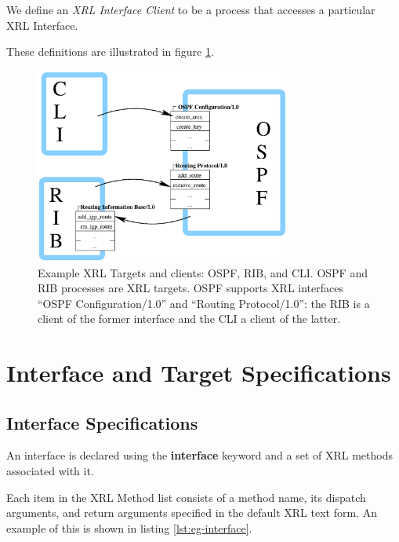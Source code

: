 \documentclass[11pt]{article}
\begin{document}
We define an \emph{XRL Interface Client} to be a process that accesses
a particular XRL Interface.

These definitions are illustrated in figure \ref{fig:eg-interfaces}.

\begin{figure}
  \begin{center}
    \includegraphics[width=0.75\textwidth]{figs/xrl_ifs}
  \end{center}
  \caption{Example XRL Targets and clients: OSPF, RIB, and CLI.
OSPF and RIB processes are XRL targets.  OSPF supports XRL interfaces
``OSPF Configuration/1.0'' and ``Routing Protocol/1.0'': the RIB is a
client of the former interface and the CLI a client of the latter.
}
  \label{fig:eg-interfaces}
\end{figure}

\section{Interface and Target Specifications}

\subsection{Interface Specifications}

An interface is declared using the \textbf{interface} keyword and a
set of XRL methods associated with it.

\smallskip
\noindent{}

\smallskip Each item in the XRL Method list consists of a method name, its
dispatch arguments, and return arguments specified in the default XRL
text form.  An example of this is shown in listing \ref{lst:eg-interface}.
\end{document}
